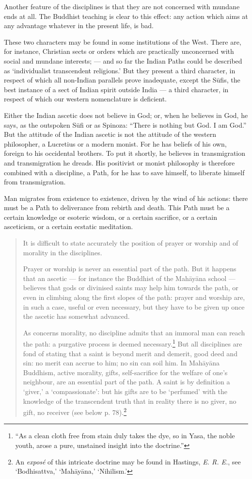 \documentclass[a4paper, 11pt, oneside, english]{article}
\begin{document}
Another feature of the disciplines is that they are not concerned with mundane ends at all. The Buddhist teaching is clear to this effect: any action which aims at any advantage whatever in the present life, is bad.

These two characters may be found in some institutions of the West. There are, for instance, Christian sects or orders which are practically unconcerned with social and mundane interests; --- and so far the Indian Paths could be described as `individualist transcendent religions.' But they present a third character, in respect of which all non-Indian parallels prove inadequate, except the Sūfis, the best instance of a sect of Indian spirit outside India --- a third character, in respect of which our western nomenclature is deficient.

Either the Indian ascetic does not believe in God; or, when he believes in God, he says, as the outspoken Sūfi or as Spinoza: ``There is nothing but God. I am God.'' But the attitude of the Indian ascetic is not the attitude of the western philosopher, a Lucretius or a modern monist. For he has beliefs of his own, foreign to his occidental brothers. To put it shortly, he believes in transmigration and transmigration he dreads. His positivist or monist philosophy is therefore combined with a discipline, a Path, for he has to save himself, to liberate himself from transmigration.

Man migrates from existence to existence, driven by the wind of his actions: there must be a Path to deliverance from rebirth and death. This Path must be a certain knowledge or esoteric wisdom, or a certain sacrifice, or a certain asceticism, or a certain ecstatic meditation.
\begin{quotation}
\small
It is difficult to state accurately the position of prayer or worship and of morality in the disciplines.

Prayer or worship is never an essential part of the path. But it happens that an ascetic --- for instance the Buddhist of the Mahāyāna school --- believes that gods or divinised saints may help him towards the path, or even in climbing along the first slopes of the path: prayer and worship are, in such a case, useful or even necessary, but they have to be given up once the ascetic has somewhat advanced.

As concerns morality, no discipline admits that an immoral man can reach the path: a purgative process is deemed necessary.\footnote{``As a clean cloth free from stain duly takes the dye, so in Yasa, the noble youth, arose a pure, unstained insight into the doctrine.''} But all disciplines are fond of stating that a saint is beyond merit and demerit, good deed and sin: no merit can accrue to him; no sin can soil him. In Mahāyāna Buddhism, active morality, gifts, self-sacrifice for the welfare of one's neighbour, are an essential part of the path. A saint is by definition a `giver,' a `compassionate': but his gifts are to be `perfumed' with the knowledge of the transcendent truth that in reality there is no giver, no gift, no receiver (see below p. 78).\footnote{An \emph{exposé} of this intricate doctrine may be found in Hastings, \emph{E. R. E.}, see `Bodhisattva,' `Mahāyāna,' `Nihilism.'}
\end{quotation}
\end{document}
